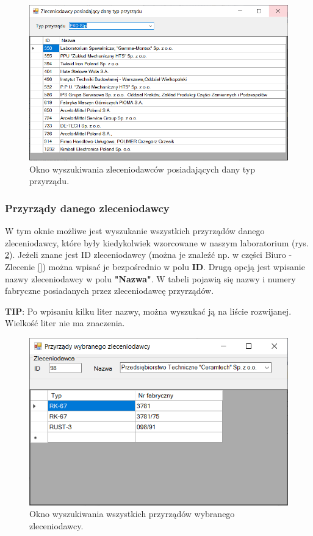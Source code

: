 \begin{figure}[htb]
	\centering
	\includegraphics{obrazki/Wyszukiwanie/Zleceniodawcy/wyszukiwanie_po_przyrzadzie.png}
	\caption{Okno wyszukiwania zleceniodawców posiadających dany typ przyrządu.}
	\label{wyszPoPrzyrzadzie}
\end{figure}

\subsubsection{Przyrządy danego zleceniodawcy}
\label{przyrz_zleceniodawcy}

W tym oknie możliwe jest wyszukanie wszystkich przyrządów danego zleceniodawcy, które były kiedykolwiek wzorcowane w naszym laboratorium (rys. \ref{przyrzadyZleceniodawcy}). Jeżeli znane jest ID zleceniodawcy (można je znaleźć np. w części Biuro - Zlecenie \ref{}) można wpisać je bezpośrednio w polu \textbf{ID}. Drugą opcją jest wpisanie nazwy zleceniodawcy w polu \textbf{"Nazwa"}. W tabeli pojawią się nazwy i numery fabryczne posiadanych przez zleceniodawcę przyrządów.

\textbf{TIP}: Po wpisaniu kilku liter nazwy, można wyszukać ją na liście rozwijanej. Wielkość liter nie ma znaczenia.

\begin{figure}[htb]
	\centering
	\includegraphics{obrazki/Wyszukiwanie/Zleceniodawcy/przyrzady_zleceniodawcy.png}
	\caption{Okno wyszukiwania wszystkich przyrządów wybranego zleceniodawcy.}
	\label{przyrzadyZleceniodawcy}
\end{figure}
